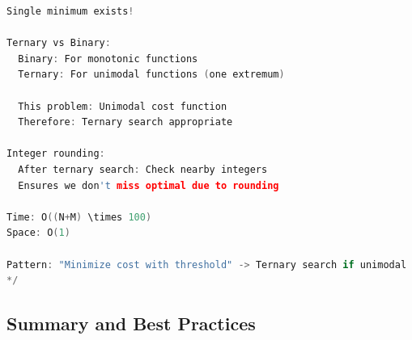 \documentclass[11pt,a4paper,oneside]{book}
\begin{document}
\begin{lstlisting}[language=C++, caption=Complete Ternary Search Solutions - NEW PROBLEM]
  Single minimum exists!

Ternary vs Binary:
  Binary: For monotonic functions
  Ternary: For unimodal functions (one extremum)
  
  This problem: Unimodal cost function
  Therefore: Ternary search appropriate

Integer rounding:
  After ternary search: Check nearby integers
  Ensures we don't miss optimal due to rounding

Time: O((N+M) \times 100)
Space: O(1)

Pattern: "Minimize cost with threshold" -> Ternary search if unimodal
*/
\end{lstlisting}

\subsection{Summary and Best Practices}
\end{document}
